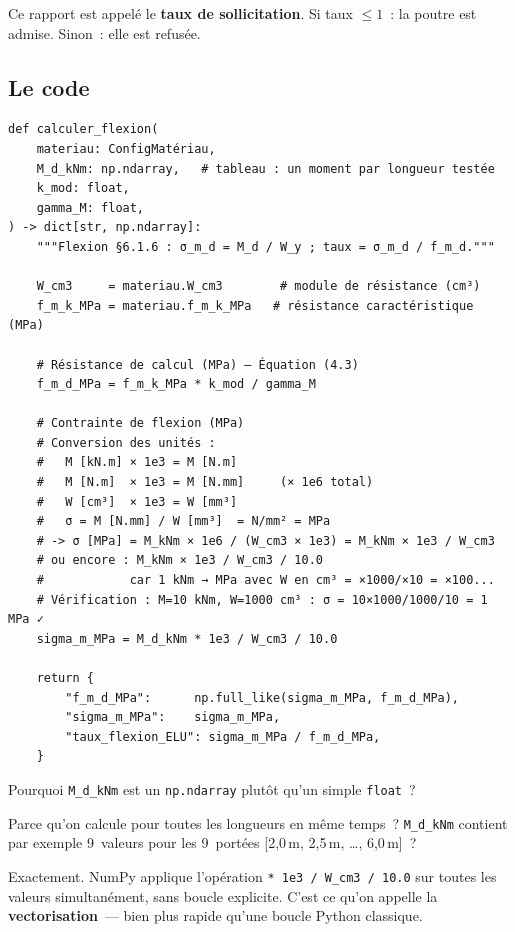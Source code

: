 \documentclass[12pt, a4paper, openany]{book}
\newcommand{\py}[1]{\texttt{#1}}
\newcommand{\fichier}[1]{\texttt{\textit{#1}}}
\begin{document}
Ce rapport est appel\'e le \textbf{taux de sollicitation}.
Si taux $\leq 1$~: la poutre est admise. Sinon~: elle est refus\'ee.

\subsection{Le code}

\begin{lstlisting}[style=python, caption={\fichier{ec5/elu.py} --- fonction \py{calculer\_flexion()}}]
def calculer_flexion(
    materiau: ConfigMatériau,
    M_d_kNm: np.ndarray,   # tableau : un moment par longueur testée
    k_mod: float,
    gamma_M: float,
) -> dict[str, np.ndarray]:
    """Flexion §6.1.6 : σ_m_d = M_d / W_y ; taux = σ_m_d / f_m_d."""

    W_cm3     = materiau.W_cm3        # module de résistance (cm³)
    f_m_k_MPa = materiau.f_m_k_MPa   # résistance caractéristique (MPa)

    # Résistance de calcul (MPa) — Équation (4.3)
    f_m_d_MPa = f_m_k_MPa * k_mod / gamma_M

    # Contrainte de flexion (MPa)
    # Conversion des unités :
    #   M [kN.m] × 1e3 = M [N.m]
    #   M [N.m]  × 1e3 = M [N.mm]     (× 1e6 total)
    #   W [cm³]  × 1e3 = W [mm³]
    #   σ = M [N.mm] / W [mm³]  = N/mm² = MPa
    # -> σ [MPa] = M_kNm × 1e6 / (W_cm3 × 1e3) = M_kNm × 1e3 / W_cm3
    # ou encore : M_kNm × 1e3 / W_cm3 / 10.0
    #            car 1 kNm → MPa avec W en cm³ = ×1000/×10 = ×100...
    # Vérification : M=10 kNm, W=1000 cm³ : σ = 10×1000/1000/10 = 1 MPa ✓
    sigma_m_MPa = M_d_kNm * 1e3 / W_cm3 / 10.0

    return {
        "f_m_d_MPa":      np.full_like(sigma_m_MPa, f_m_d_MPa),
        "sigma_m_MPa":    sigma_m_MPa,
        "taux_flexion_ELU": sigma_m_MPa / f_m_d_MPa,
    }
\end{lstlisting}

\begin{maitre}
Pourquoi \py{M\_d\_kNm} est un \py{np.ndarray} plut\^ot qu'un simple \py{float}~?
\end{maitre}

\begin{apprenti}
Parce qu'on calcule pour toutes les longueurs en m\^eme temps~?
\py{M\_d\_kNm} contient par exemple 9~valeurs pour les 9~port\'ees
[2,0\,m, 2,5\,m, \ldots, 6,0\,m]~?
\end{apprenti}

\begin{maitre}
Exactement. NumPy applique l'op\'eration \py{* 1e3 / W\_cm3 / 10.0}
sur toutes les valeurs simultan\'ement, sans boucle explicite.
C'est ce qu'on appelle la \textbf{vectorisation}~--- bien plus rapide
qu'une boucle Python classique.
\end{maitre}
\end{document}
